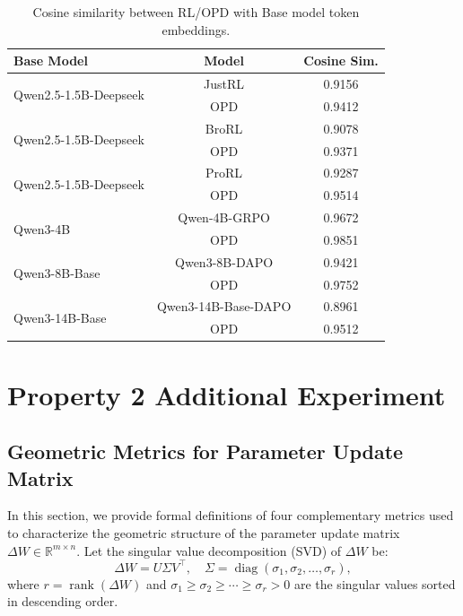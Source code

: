 \documentclass{article}
\begin{document}
\begin{table}[t]
\centering
\caption{Cosine similarity between RL/OPD with Base model token embeddings.}
\setlength{\tabcolsep}{4pt}
\label{embed_similarity}
\begin{tabular}{lcc}
\toprule
\textbf{Base Model} & \textbf{Model} & \textbf{Cosine Sim.} \\
\midrule
\multirow{2}{*}{Qwen2.5-1.5B-Deepseek} & JustRL \citep{he2025justrlscaling15bllm} & 0.9156 \\
                                     & OPD & 0.9412 \\
\midrule
\multirow{2}{*}{Qwen2.5-1.5B-Deepseek} & BroRL \citep{Hu2025BroRLSR} & 0.9078 \\
                  & OPD & 0.9371 \\
\midrule
\multirow{2}{*}{Qwen2.5-1.5B-Deepseek} & ProRL \citep{Liu2025ProRLPR} & 0.9287 \\
                  & OPD & 0.9514 \\
\midrule
\multirow{2}{*}{Qwen3-4B} & Qwen-4B-GRPO \citep{Yang2026LearningBT} & 0.9672 \\
                          & OPD & 0.9851 \\
\midrule
\multirow{2}{*}{Qwen3-8B-Base} & Qwen3-8B-DAPO \citep{cai2025predictability} & 0.9421 \\
                              & OPD & 0.9752 \\
\midrule
\multirow{2}{*}{Qwen3-14B-Base} & Qwen3-14B-Base-DAPO & 0.8961 \\
                                & OPD & 0.9512 \\
\bottomrule
\end{tabular}
\end{table}



\newpage
\clearpage
\section{Property 2 Additional Experiment}
\label{Property 2 Additional Experiment}


\subsection{Geometric Metrics for Parameter Update Matrix}
\label{Geometric Metrics for Parameter Update Matrix}

In this section, we provide formal definitions of four complementary metrics used to characterize the geometric structure of the parameter update matrix $\Delta W \in \mathbb{R}^{m \times n}$. Let the singular value decomposition (SVD) of $\Delta W$ be:
\begin{equation}
\Delta W = U \Sigma V^\top, \quad \Sigma = \operatorname{diag}(\sigma_1, \sigma_2, \ldots, \sigma_r),
\end{equation}
where $r = \operatorname{rank}(\Delta W)$ and $\sigma_1 \ge \sigma_2 \ge \cdots \ge \sigma_r > 0$ are the singular values sorted in descending order.
\end{document}
